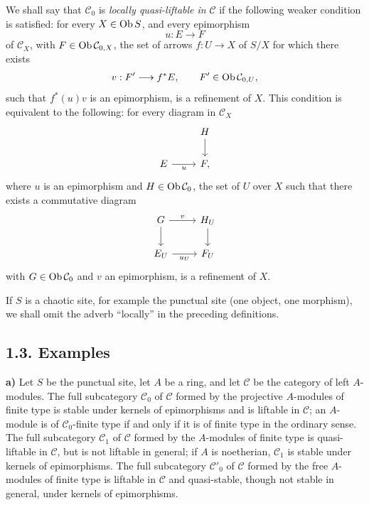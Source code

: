 \documentclass[11pt]{article}
\begin{document}
We shall say that \(\mathcal C_0\) is \emph{locally quasi-liftable in} \(\mathcal C\) if the following weaker condition is satisfied: for every \(X\in\operatorname{Ob} S\), and every epimorphism
\[
  u:E\longrightarrow F
\]
of \(\mathcal C_X\), with \(F\in\operatorname{Ob}\mathcal C_{0,X}\), the set of arrows \(f:U\to X\) of \(S/X\) for which there exists
\[
  v:F'\longrightarrow f^*E,\qquad F'\in\operatorname{Ob}\mathcal C_{0,U},
\]
such that \(f^*(u)v\) is an epimorphism, is a refinement of \(X\). This condition is equivalent to the following: for every diagram in \(\mathcal C_X\)
\[
\begin{tikzcd}
& H \arrow[d]\\
E \arrow[r,"u"'] & F ,
\end{tikzcd}
\]
where \(u\) is an epimorphism and \(H\in\operatorname{Ob}\mathcal C_0\), the set of \(U\) over \(X\) such that there exists a commutative diagram
\[
\begin{tikzcd}
G \arrow[r,"v"] \arrow[d] & H_U \arrow[d]\\
E_U \arrow[r,"u_U"'] & F_U
\end{tikzcd}
\]
with \(G\in\operatorname{Ob}\mathcal C_0\) and \(v\) an epimorphism, is a refinement of \(X\).

If \(S\) is a chaotic site, for example the punctual site (one object, one morphism), we shall omit the adverb ``locally'' in the preceding definitions.

\subsection*{1.3. Examples}

\textbf{a)} Let \(S\) be the punctual site, let \(A\) be a ring, and let \(\mathcal C\) be the category of left \(A\)-modules. The full subcategory \(\mathcal C_0\) of \(\mathcal C\) formed by the projective \(A\)-modules of finite type is stable under kernels of epimorphisms and is liftable in \(\mathcal C\); an \(A\)-module is of \(\mathcal C_0\)-finite type if and only if it is of finite type in the ordinary sense. The full subcategory \(\mathcal C_1\) of \(\mathcal C\) formed by the \(A\)-modules of finite type is quasi-liftable in \(\mathcal C\), but is not liftable in general; if \(A\) is noetherian, \(\mathcal C_1\) is stable under kernels of epimorphisms. The full subcategory \(\mathcal C'_0\) of \(\mathcal C\) formed by the free \(A\)-modules of finite type is liftable in \(\mathcal C\) and quasi-stable, though not stable in general, under kernels of epimorphisms.
\end{document}
